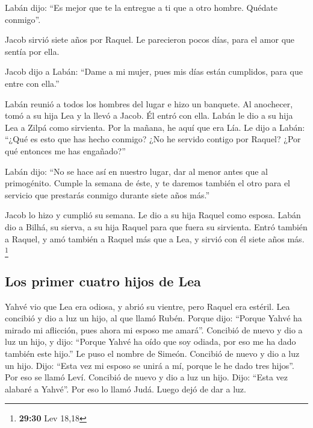 Labán dijo: ``Es mejor que te la entregue a ti que a
otro hombre. Quédate conmigo''.

 Jacob sirvió siete años por Raquel. Le parecieron pocos
días, para el amor que sentía por ella.

 Jacob dijo a Labán: ``Dame a mi mujer, pues mis días
están cumplidos, para que entre con ella.''

 Labán reunió a todos los hombres del lugar e hizo un
banquete.  Al anochecer, tomó a su hija Lea y la llevó a
Jacob. Él entró con ella.  Labán le dio a su hija Lea a
Zilpá como sirvienta.  Por la mañana, he aquí que era
Lía. Le dijo a Labán: ``¿Qué es esto que has hecho conmigo? ¿No he
servido contigo por Raquel? ¿Por qué entonces me has engañado?''

 Labán dijo: ``No se hace así en nuestro lugar, dar al
menor antes que al primogénito.  Cumple la semana de
éste, y te daremos también el otro para el servicio que prestarás
conmigo durante siete años más.''

 Jacob lo hizo y cumplió su semana. Le dio a su hija
Raquel como esposa.  Labán dio a Bilhá, su sierva, a su
hija Raquel para que fuera su sirvienta.  Entró también a
Raquel, y amó también a Raquel más que a Lea, y sirvió con él siete años
más. \footnote{\textbf{29:30} Lev 18,18}

\hypertarget{los-primer-cuatro-hijos-de-lea}{%
\subsection{Los primer cuatro hijos de
Lea}\label{los-primer-cuatro-hijos-de-lea}}

 Yahvé vio que Lea era odiosa, y abrió su vientre, pero
Raquel era estéril.  Lea concibió y dio a luz un hijo, al
que llamó Rubén. Porque dijo: ``Porque Yahvé ha mirado mi aflicción,
pues ahora mi esposo me amará''.  Concibió de nuevo y dio
a luz un hijo, y dijo: ``Porque Yahvé ha oído que soy odiada, por eso me
ha dado también este hijo.'' Le puso el nombre de Simeón.
 Concibió de nuevo y dio a luz un hijo. Dijo: ``Esta vez
mi esposo se unirá a mí, porque le he dado tres hijos''. Por eso se
llamó Leví.  Concibió de nuevo y dio a luz un hijo. Dijo:
``Esta vez alabaré a Yahvé''. Por eso lo llamó Judá. Luego dejó de dar a
luz.

